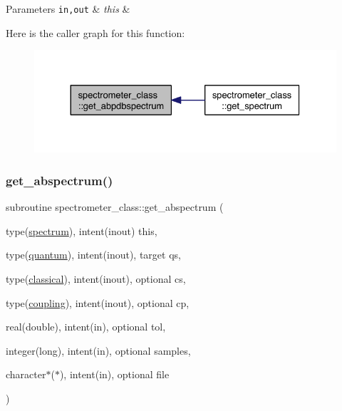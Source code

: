 \begin{DoxyParams}[1]{Parameters}
\mbox{\tt in,out}  & {\em this} & \\
\hline
\end{DoxyParams}
Here is the caller graph for this function\+:\nopagebreak
\begin{figure}[H]
\begin{center}
\leavevmode
\includegraphics[width=330pt]{namespacespectrometer__class_af1fc802879075c7e5e42ef4baac69445_icgraph}
\end{center}
\end{figure}
\mbox{\label{namespacespectrometer__class_ad2c4936524c8702e1c4e53a54a043f31}} 
\subsubsection{\texorpdfstring{get\+\_\+abspectrum()}{get\_abspectrum()}}
{\footnotesize\ttfamily subroutine spectrometer\+\_\+class\+::get\+\_\+abspectrum (\begin{DoxyParamCaption}\item[{type(\hyperlink{structspectrometer__class_1_1spectrum}{spectrum}), intent(inout)}]{this,  }\item[{type(\hyperlink{structquantum__class_1_1quantum}{quantum}), intent(inout), target}]{qs,  }\item[{type(\hyperlink{structclassical__class_1_1classical}{classical}), intent(inout), optional}]{cs,  }\item[{type(\hyperlink{structcoupling__class_1_1coupling}{coupling}), intent(inout), optional}]{cp,  }\item[{real(double), intent(in), optional}]{tol,  }\item[{integer(long), intent(in), optional}]{samples,  }\item[{character$\ast$($\ast$), intent(in), optional}]{file }\end{DoxyParamCaption})\hspace{0.3cm}{\ttfamily [private]}}




